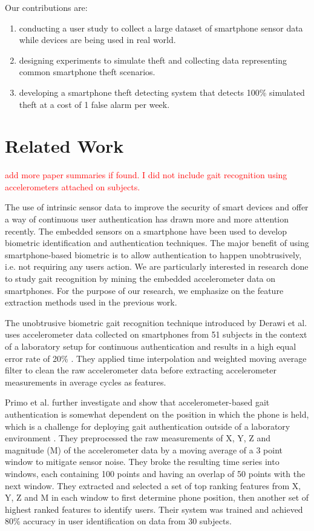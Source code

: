 \documentclass{soups}
\begin{document}
Our contributions are:
\begin{enumerate}
  \item conducting a user study to collect a large dataset of smartphone sensor data while devices are being used in real world.
  \item designing experiments to simulate theft and collecting data representing common smartphone theft scenarios.
  \item developing a smartphone theft detecting system that detects 100\% simulated theft at a cost of 1 false alarm per week.
\end{enumerate}



\section{Related Work}

\textcolor{red}{add more paper summaries if found. I did not include gait recognition using accelerometers attached on subjects.}

The use of intrinsic sensor data to improve the security of smart devices and offer a way of continuous user authentication has drawn more and more attention recently. The embedded sensors on a smartphone have been used to develop biometric identification and authentication techniques. The major benefit of using smartphone-based biometric is to allow authentication to happen unobtrusively, i.e. not requiring any users action. We are particularly interested in research done to study gait recognition by mining the embedded accelerometer data on smartphones. For the purpose of our research, we emphasize on the feature extraction methods used in the previous work.

The unobtrusive biometric gait recognition technique introduced by Derawi et al. uses accelerometer data collected on smartphones from 51 subjects in the context of a laboratory setup for continuous authentication and results in a high equal error rate of 20\% \cite{derawi:gait}. They applied time interpolation and weighted moving average filter to clean the raw accelerometer data before extracting accelerometer measurements in average cycles as features.

Primo et al. further investigate and show that accelerometer-based gait authentication is somewhat dependent on the position in which the phone is held, which is a challenge for deploying gait authentication outside of a laboratory environment \cite{primo:context}. They preprocessed the raw measurements of X, Y, Z and magnitude (M) of the accelerometer data by a moving average of a 3 point window to mitigate sensor noise. They broke the resulting time series into windows, each containing 100 points and having an overlap of 50 points with the next window. They extracted and selected a set of top ranking features from X, Y, Z and M in each window to first determine phone position, then another set of highest ranked features to identify users. Their system was trained and achieved 80\% accuracy in user identification on data from 30 subjects.
\end{document}
